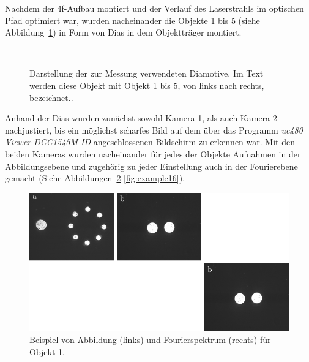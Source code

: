 \clearpage


Nachdem der 4f-Aufbau montiert und der Verlauf des Laserstrahls im optischen Pfad optimiert war, wurden nacheinander die Objekte 1 bis 5 (siehe Abbildung~\ref{fig:Objekte-aus-Anleitungsheft}) in Form von Dias in dem Objektträger montiert.

\begin{figure}[h]
	\centering
	~~
	~~
	~~
	~~
	\caption[Die zur Messung verwendeten Diamotive]{
		Darstellung der zur Messung verwendeten Diamotive. Im Text werden diese Objekt mit Objekt 1 bis 5, von links nach rechts, bezeichnet..
	}
	\label{fig:Objekte-aus-Anleitungsheft}
\end{figure}

Anhand der Dias wurden zunächst sowohl Kamera 1, als auch Kamera 2 nachjustiert, bis ein möglichst scharfes Bild auf dem über das Programm \textit{uc480 Viewer-DCC1545M-ID} angeschlossenen Bildschirm zu erkennen war. Mit den beiden Kameras wurden nacheinander für jedes der Objekte Aufnahmen in der Abbildungsebene und zugehörig zu jeder Einstellung auch in der Fourierebene gemacht (Siehe Abbildungen~\ref{fig:example1}-\ref{fig:example16}).

\begin{figure}[h]
	\centering
	\includegraphics{images/ergebniss_ex1/abb.pdf}
	\caption{
		Beispiel von Abbildung (links) und Fourierspektrum (rechts) für Objekt 1.
	}
	\label{fig:example1}
\end{figure}


